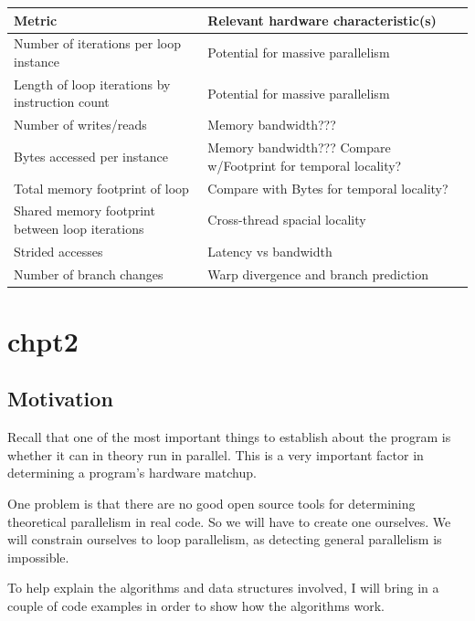 \documentclass[12pt,twoside]{reedthesis}
\begin{document}
		\begin{tabular}{ |p{5.5cm}|p{8cm}| }
			\hline
			Metric & Relevant hardware characteristic(s) \\
			\hline \hline
			Number of iterations per loop instance & Potential for massive parallelism \\
			\hline
			Length of loop iterations by instruction count & Potential for massive parallelism \\
			\hline
			Number of writes/reads & Memory bandwidth??? \\
			\hline
			Bytes accessed per instance & Memory bandwidth??? Compare w/Footprint for temporal locality? \\
			\hline
			Total memory footprint of loop & Compare with Bytes for temporal locality?  \\
			\hline
			Shared memory footprint between loop iterations & Cross-thread spacial locality \\
			\hline
			Strided accesses  & Latency vs bandwidth \\
			\hline
			Number of branch changes & Warp divergence and branch prediction \\
			\hline
		\end{tabular}
	
	
\chapter{chpt2}
		
		
			
	\section{Motivation}
	
		Recall that one of the most important things to establish about the program is whether it can in theory run in parallel. This is a very important factor in determining a program's hardware matchup.

		One problem is that there are no good open source tools for determining theoretical parallelism in real code. So we will have to create one ourselves. We will constrain ourselves to loop parallelism, as detecting general parallelism is impossible. 
		
		To help explain the algorithms and data structures involved, I will bring in a couple of code examples in order to show how the algorithms work. 
		
\end{document}

